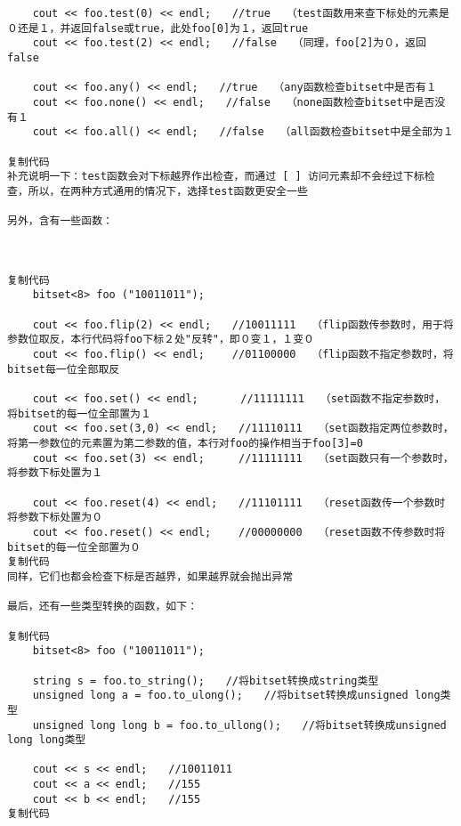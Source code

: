\documentclass{article}
\begin{document}
\begin{CJK*}{UTF8}{song}
\begin{lstlisting}
    cout << foo.test(0) << endl;　　//true　　（test函数用来查下标处的元素是０还是１，并返回false或true，此处foo[0]为１，返回true
    cout << foo.test(2) << endl;　　//false　　（同理，foo[2]为０，返回false

    cout << foo.any() << endl;　　//true　　（any函数检查bitset中是否有１
    cout << foo.none() << endl;　　//false　　（none函数检查bitset中是否没有１
    cout << foo.all() << endl;　　//false　　（all函数检查bitset中是全部为１

复制代码
补充说明一下：test函数会对下标越界作出检查，而通过 [ ] 访问元素却不会经过下标检查，所以，在两种方式通用的情况下，选择test函数更安全一些

另外，含有一些函数：

　

复制代码
    bitset<8> foo ("10011011");

    cout << foo.flip(2) << endl;　　//10011111　　（flip函数传参数时，用于将参数位取反，本行代码将foo下标２处"反转"，即０变１，１变０
    cout << foo.flip() << endl;　　 //01100000　　（flip函数不指定参数时，将bitset每一位全部取反

    cout << foo.set() << endl;　　　　//11111111　　（set函数不指定参数时，将bitset的每一位全部置为１
    cout << foo.set(3,0) << endl;　　//11110111　　（set函数指定两位参数时，将第一参数位的元素置为第二参数的值，本行对foo的操作相当于foo[3]=0
    cout << foo.set(3) << endl;　　  //11111111　　（set函数只有一个参数时，将参数下标处置为１

    cout << foo.reset(4) << endl;　　//11101111　　（reset函数传一个参数时将参数下标处置为０
    cout << foo.reset() << endl;　　 //00000000　　（reset函数不传参数时将bitset的每一位全部置为０
复制代码
同样，它们也都会检查下标是否越界，如果越界就会抛出异常

最后，还有一些类型转换的函数，如下：

复制代码
    bitset<8> foo ("10011011");

    string s = foo.to_string();　　//将bitset转换成string类型
    unsigned long a = foo.to_ulong();　　//将bitset转换成unsigned long类型
    unsigned long long b = foo.to_ullong();　　//将bitset转换成unsigned long long类型

    cout << s << endl;　　//10011011
    cout << a << endl;　　//155
    cout << b << endl;　　//155
复制代码
\end{lstlisting}


\end{CJK*}
\end{document}
